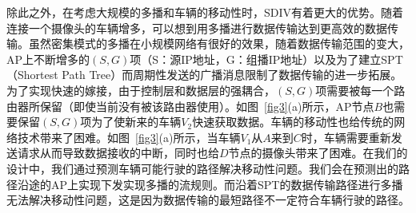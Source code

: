 
除此之外，在考虑大规模的多播和车辆的移动性时，SDIV有着更大的优势。随着连接一个摄像头的车辆增多，可以想到用多播进行数据传输达到更高效的数据传输。虽然密集模式的多播在小规模网络有很好的效果，随着数据传输范围的变大，AP上不断增多的$(S,G)$项（S：源IP地址，G：组播IP地址）以及为了建立SPT（Shortest Path Tree）而周期性发送的广播消息限制了数据传输的进一步拓展。为了实现快速的嫁接，由于控制层和数据层的强耦合，$(S,G)$项需要被每一个路由器所保留（即使当前没有被该路由器使用）。如图~\ref{fig3}(a)所示，AP节点$B$也需要保留$(S,G)$项为了使新来的车辆$V_{2}$快速获取数据。车辆的移动性也给传统的网络技术带来了困难。如图~\ref{fig3}(a)所示，当车辆$V_{1}$从$A$来到$C$时，车辆需要重新发送请求从而导致数据接收的中断，同时也给$D$节点的摄像头带来了困难。在我们的设计中，我们通过预测车辆可能行驶的路径解决移动性问题。我们会在预测出的路径沿途的AP上实现下发实现多播的流规则。而沿着SPT的数据传输路径进行多播无法解决移动性问题，这是因为数据传输的最短路径不一定符合车辆行驶的路径。

